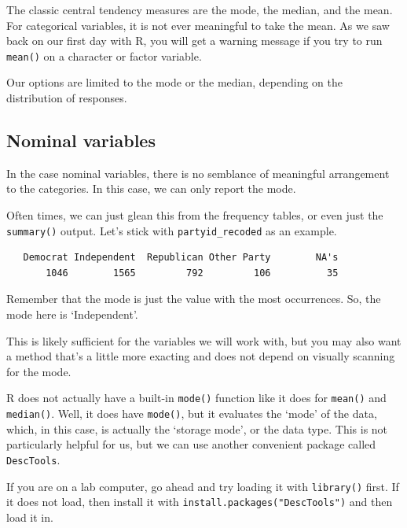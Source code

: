\documentclass[
  letterpaper,
  DIV=11,
  numbers=noendperiod]{scrreprt}
\newenvironment{Shaded}{\begin{snugshade}}{\end{snugshade}}
\newcommand{\FunctionTok}[1]{\textcolor[rgb]{0.28,0.35,0.67}{#1}}
\newcommand{\NormalTok}[1]{\textcolor[rgb]{0.00,0.23,0.31}{#1}}
\newcommand{\SpecialCharTok}[1]{\textcolor[rgb]{0.37,0.37,0.37}{#1}}
\begin{document}
The classic central tendency measures are the mode, the median, and the
mean. For categorical variables, it is not ever meaningful to take the
mean. As we saw back on our first day with R, you will get a warning
message if you try to run \texttt{mean()} on a character or factor
variable.

Our options are limited to the mode or the median, depending on the
distribution of responses.

\subsection{Nominal variables}\label{nominal-variables}

In the case nominal variables, there is no semblance of meaningful
arrangement to the categories. In this case, we can only report the
mode.

Often times, we can just glean this from the frequency tables, or even
just the \texttt{summary()} output. Let's stick with
\texttt{partyid\_recoded} as an example.

\begin{Shaded}
\end{Shaded}

\begin{verbatim}
   Democrat Independent  Republican Other Party        NA's 
       1046        1565         792         106          35 
\end{verbatim}

Remember that the mode is just the value with the most occurrences. So,
the mode here is `Independent'.

This is likely sufficient for the variables we will work with, but you
may also want a method that's a little more exacting and does not depend
on visually scanning for the mode.

R does not actually have a built-in \texttt{mode()} function like it
does for \texttt{mean()} and \texttt{median()}. Well, it does have
\texttt{mode()}, but it evaluates the `mode' of the data, which, in this
case, is actually the `storage mode', or the data type. This is not
particularly helpful for us, but we can use another convenient package
called \texttt{DescTools}.

If you are on a lab computer, go ahead and try loading it with
\texttt{library()} first. If it does not load, then install it with
\texttt{install.packages("DescTools")} and then load it in.
\end{document}
